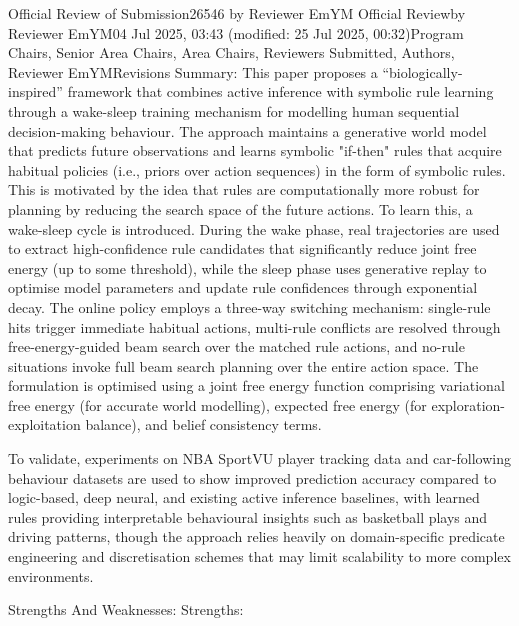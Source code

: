 Official Review of Submission26546 by Reviewer EmYM
Official Reviewby Reviewer EmYM04 Jul 2025, 03:43 (modified: 25 Jul 2025, 00:32)Program Chairs, Senior Area Chairs, Area Chairs, Reviewers Submitted, Authors, Reviewer EmYMRevisions
Summary:
This paper proposes a “biologically-inspired” framework that combines active inference with symbolic rule learning through a wake-sleep training mechanism for modelling human sequential decision-making behaviour. The approach maintains a generative world model that predicts future observations and learns symbolic "if-then" rules that acquire habitual policies (i.e., priors over action sequences) in the form of symbolic rules. This is motivated by the idea that rules are computationally more robust for planning by reducing the search space of the future actions. To learn this, a wake-sleep cycle is introduced. During the wake phase, real trajectories are used to extract high-confidence rule candidates that significantly reduce joint free energy (up to some threshold), while the sleep phase uses generative replay to optimise model parameters and update rule confidences through exponential decay. The online policy employs a three-way switching mechanism: single-rule hits trigger immediate habitual actions, multi-rule conflicts are resolved through free-energy-guided beam search over the matched rule actions, and no-rule situations invoke full beam search planning over the entire action space. The formulation is optimised using a joint free energy function comprising variational free energy (for accurate world modelling), expected free energy (for exploration-exploitation balance), and belief consistency terms.

To validate, experiments on NBA SportVU player tracking data and car-following behaviour datasets are used to show improved prediction accuracy compared to logic-based, deep neural, and existing active inference baselines, with learned rules providing interpretable behavioural insights such as basketball plays and driving patterns, though the approach relies heavily on domain-specific predicate engineering and discretisation schemes that may limit scalability to more complex environments.

Strengths And Weaknesses:
Strengths:

